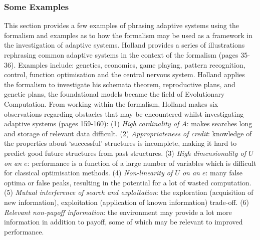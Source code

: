 \subsubsection{Some Examples}
\label{subsubsec:cs:adaptive:examplse}
This section provides a few examples of phrasing adaptive systems using the formalism and examples as to how the formalism may be used as a framework in the investigation of adaptive systems. Holland provides a series of illustrations rephrasing common adaptive systems in the context of the formalism \cite{Holland1992} (pages 35-36). Examples include: genetics, economics, game playing, pattern recognition, control, function optimisation and the central nervous system. Holland applies the formalism to investigate his schemata theorem, reproductive plans, and genetic plans, the foundational models became the field of Evolutionary Computation. From working within the formalism, Holland makes six observations regarding obstacles that may be encountered whilst investigating adaptive systems \cite{Holland1992} (pages 159-160): (1) \emph{High cardinality of $A$}: makes searches long and storage of relevant data difficult. (2) \emph{Appropriateness of credit}: knowledge of the properties about `successful' structures is incomplete, making it hard to predict good future structures from past structures. (3) \emph{High dimensionality of $U$ on an $e$}: performance is a function of a large number of variables which is difficult for classical optimisation methods. (4) \emph{Non-linearity of $U$ on an $e$}: many false optima or false peaks, resulting in the potential for a lot of wasted computation. (5) \emph{Mutual interference of search and exploitation}: the exploration (acquisition of new information), exploitation (application of known information) trade-off. (6) \emph{Relevant non-payoff information}: the environment may provide a lot more information in addition to payoff, some of which may be relevant to improved performance.


